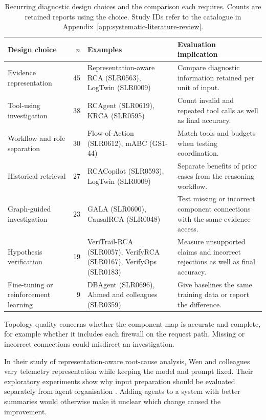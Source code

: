 \begin{table}[htbp]
\centering\small
\caption{Recurring diagnostic design choices and the comparison each requires.
Counts are retained reports using the choice. Study IDs refer to the
catalogue in Appendix~\ref{app:systematic-literature-review}.}
\label{tab:state:patterns}
\begin{tabularx}{\textwidth}{@{}>{\raggedright\arraybackslash}p{}r>{\raggedright\arraybackslash}X>{\raggedright\arraybackslash}X@{}}
\toprule
Design choice & $n$ & Examples & Evaluation implication \\
\midrule
Evidence representation & 45 & Representation-aware RCA (SLR0563), LogTwin (SLR0009) & Compare diagnostic information retained per unit of input. \\
Tool-using investigation & 38 & RCAgent (SLR0619), KRCA (SLR0595) & Count invalid and repeated tool calls as well as final accuracy. \\
Workflow and role separation & 30 & Flow-of-Action (SLR0612), mABC (GS1-44) & Match tools and budgets when testing coordination. \\
Historical retrieval & 27 & RCACopilot (SLR0593), LogTwin (SLR0009) & Separate benefits of prior cases from the reasoning workflow. \\
Graph-guided investigation & 23 & GALA (SLR0600), CausalRCA (SLR0048) & Test missing or incorrect component connections with the same evidence access. \\
Hypothesis verification & 19 & VeriTrail-RCA (SLR0057), VerifyRCA (SLR0167), VerifyOps (SLR0183) & Measure unsupported claims and incorrect rejections as well as final accuracy. \\
Fine-tuning or reinforcement learning & 9 & DBAgent (SLR0696), Ahmed and colleagues (SLR0359) & Give baselines the same training data or report the difference. \\
\bottomrule
\end{tabularx}
\end{table}

Topology quality concerns whether the component map is accurate and
complete, for example
whether it includes each firewall on the request path. Missing or incorrect
connections could misdirect an investigation.

In their study of representation-aware root-cause analysis, Wen and colleagues
vary telemetry representation while keeping the model and
prompt fixed. Their exploratory experiments show why input preparation
should be evaluated separately from agent organisation
\parencite[Section~6]{wen2026representation}. Adding agents to a system
with better summaries would otherwise make it unclear which change
caused the improvement.

